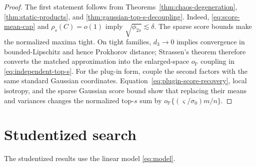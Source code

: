 \documentclass[a4paper,11pt,english]{article}
\newcommand{\Prob}{\mathbb P}
\begin{document}
\begin{proof}
The first statement follows from Theorems~\ref{thm:chaos-degeneration},
\ref{thm:static-products}, and \ref{thm:gaussian-top-s-decoupling}.
Indeed, \eqref{eq:score-mean-cap} and $\rho_s(C)=o(1)$ imply
$\sqrt{\phi_{2s}}\lesssim\delta$.
The sparse score bounds make the normalized maxima tight.  On tight
families, $d_3\to0$ implies convergence in bounded-Lipschitz and hence
Prokhorov distance; Strassen's theorem therefore converts the matched
approximation into the enlarged-space $o_{\Prob}$ coupling in
\eqref{eq:independent-top-s}.
For the plug-in form, couple the second factors with the same standard
Gaussian coordinates.  Equation~\eqref{eq:plugin-score-recovery}, local
isotropy, and the sparse Gaussian score bound show that replacing their
means and variances changes the normalized top-$s$ sum by
$o_{\Prob}\{(\varsigma/\sigma_0)m/n\}$.
\end{proof}

\section{Studentized search}

The studentized results use the linear model \eqref{eq:model}.
\end{document}
